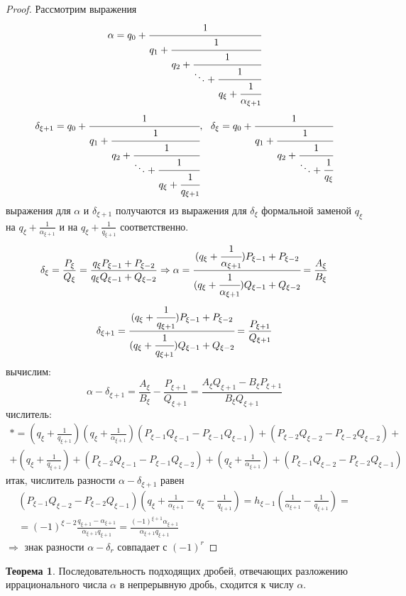 \documentclass[a4paper, 12pt]{article}
\theoremstyle{definition}
\newtheorem{theorem}{Теорема}[section]
\begin{document}
    \begin{proof}
        Рассмотрим выражения
        \[\alpha=q_0+\cfrac{1}{q_1+\cfrac{1}{q_2+\cfrac{1}{\ddots+\cfrac{1}{q_{\xi}+\cfrac{1}{\alpha_{\xi+1}}}}}}\]
        \[\delta_{\xi+1}=q_0+\cfrac{1}{q_1+\cfrac{1}{q_2+\cfrac{1}{\ddots+\cfrac{1}{q_{\xi}+\cfrac{1}{q_{\xi+1}}}}}},\ \ \delta_{\xi}=q_0+\cfrac{1}{q_1+\cfrac{1}{q_2+\cfrac{1}{\ddots+\cfrac{1}{q_{\xi}}}}}\]
        выражения для $\alpha$ и $\delta_{\xi+1}$ получаются из выражения для $\delta_{\xi}$ формальной заменой $q_{\xi}$ на $q_{\xi}+\frac{1}{\alpha_{\xi+1}}$ и на $q_{\xi}+\frac{1}{q_{\xi+1}}$ соответственно.
        \[\delta_{\xi}=\frac{P_{\xi}}{Q_{\xi}}=\frac{q_{\xi}P_{\xi-1}+P_{\xi-2}}{q_{\xi}Q_{\xi-1}+Q_{\xi-2}} \Rightarrow \alpha=\cfrac{(q_{\xi}+\cfrac{1}{\alpha_{\xi+1}})P_{\xi-1}+P_{\xi-2}}{(q_{\xi}+\cfrac{1}{\alpha_{\xi+1}})Q_{\xi-1}+Q_{\xi-2}}=\frac{A_{\xi}}{B_{\xi}}\]
        \[\delta_{\xi+1}=\cfrac{(q_{\xi}+\cfrac{1}{q_{\xi+1}})P_{\xi-1}+P_{\xi-2}}{(q_{\xi}+\cfrac{1}{q_{\xi+1}})Q_{\xi-1}+Q_{\xi-2}}=\frac{P_{\xi+1}}{Q_{\xi+1}}\]
        вычислим:
        \[\alpha-\delta_{\xi+1}=\frac{A_{\xi}}{B_{\xi}}-\frac{P_{\xi+1}}{Q_{\xi+1}}=\frac{A_{\xi}Q_{\xi+1}-B_{\xi}P_{\xi+1}}{B_{\xi}Q_{\xi+1}}\]
        числитель:
        \begin{multline*}
            \ast = (q_{\xi}+\frac{1}{q_{\xi+1}})(q_{\xi}+\frac{1}{\alpha_{\xi+1}})(P_{\xi-1}Q_{\xi-1}-P_{\xi-1}Q_{\xi-1})+(P_{\xi-2}Q_{\xi-2}-P_{\xi-2}Q_{\xi-2})+\\
            +(q_{\xi}+\frac{1}{q_{\xi+1}})+(P_{\xi-2}Q_{\xi-1}-P_{\xi-1}Q_{\xi-2})+(q_{\xi}+\frac{1}{\alpha_{\xi+1}})+(P_{\xi-1}Q_{\xi-2}-P_{\xi-2}Q_{\xi-1})
        \end{multline*}
        итак, числитель разности $\alpha-\delta_{\xi+1}$ равен
        \begin{multline*}
            (P_{\xi-1}Q_{\xi-2}-P_{\xi-2}Q_{\xi-1})(q_{\xi}+\frac{1}{\alpha_{\xi+1}}-q_{\xi}-\frac{1}{q_{\xi+1}})=h_{\xi-1}(\frac{1}{\alpha_{\xi+1}}-\frac{1}{q_{\xi+1}})=\\
            =(-1)^{\xi-2}\frac{q_{\xi+1}-\alpha_{\xi+1}}{\alpha_{\xi+1}q_{\xi+1}}=\frac{(-1)^{\xi+1}\alpha_{\xi+1}}{\alpha_{\xi+1}q_{\xi+1}}
        \end{multline*}
        $\Rightarrow$ знак разности $\alpha-\delta_r$ совпадает с $(-1)^r$
    \end{proof} 
    \begin{theorem}\label{th7.3}
        Последовательность подходящих дробей, отвечающих разложению иррационального числа $\alpha$ в непрерывную дробь, сходится к числу $\alpha$.
    \end{theorem} 
\end{document}
